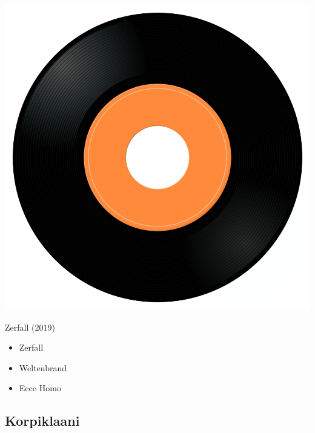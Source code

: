 \begin{minipage}[t]{0.25\textwidth}\vspace{0pt}
\captionsetup{type=figure}
\includegraphics[width=\textwidth]{Images/cover.png}
\caption*{Zerfall (2019)}
\end{minipage}
\begin{minipage}[t]{0.25\textwidth}\vspace{0pt}
\begin{itemize}[nosep,leftmargin=1em,labelwidth=*,align=left]
	\setlength{\itemsep}{0pt}
	\item Zerfall
	\item Weltenbrand
	\item Ecce Homo
\end{itemize}
\end{minipage}

\subsection{Korpiklaani}

